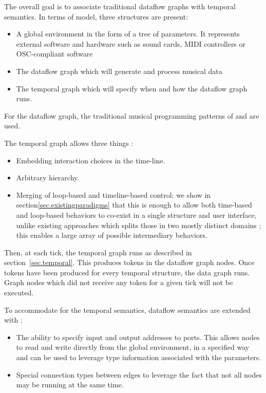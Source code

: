 \documentclass{article}
\begin{document}
The overall goal is to associate traditional dataflow graphs with temporal semantics.
In terms of model, three structures are present: 
\begin{itemize}
    \item A global environment in the form of a tree of parameters. 
          It represents external software and hardware such as sound cards, MIDI controllers or OSC-compliant software
    \item The dataflow graph which will generate and process musical data
    \item The temporal graph which will specify when and how the dataflow graph runs.
\end{itemize}

For the dataflow graph, the traditional musical programming patterns of  and  are used.

The temporal graph allows three things :
\begin{itemize}
\item Embedding interaction choices in the time-line.
\item Arbitrary hierarchy.
\item Merging of loop-based and timeline-based control: we show in section\ref{sec.existingparadigms} that this is enough to allow both time-based and loop-based behaviors to co-exist in a single structure and user interface, unlike existing approaches which splits those in two mostly distinct domains ; this enables a large array of possible intermediary behaviors.
\end{itemize} 

Then, at each tick, the temporal graph runs as described in section~\ref{sec.temporal}.
This produces tokens in the dataflow graph nodes. 
Once tokens have been produced for every temporal structure, the data graph runs.
Graph nodes which did not receive any token for a given tick will not be executed.

To accommodate for the temporal semantics, dataflow semantics are extended with : 
\begin{itemize}
    \item The ability to specify input and output addresses to ports. 
          This allows nodes to read and write directly from the global environment, in a specified way and can be used to leverage type information associated with the parameters.
    \item Special connection types between edges to leverage the fact that not all nodes may be running at the same time.
\end{itemize}
 
\end{document}
